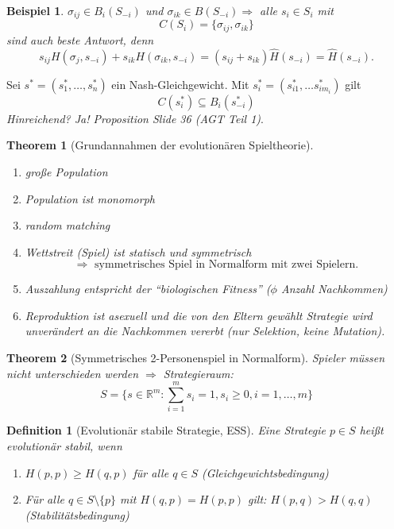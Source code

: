 \documentclass[12pt]{extreport} %
\newcommand{\R}{\mathbb{R}}
\theoremstyle{named}
\newtheorem{unnamedtheorem}{Theorem} \counterwithin{unnamedtheorem}{chapter}
\theoremstyle{itshape}
\newtheorem*{definition}{Definition}
\theoremstyle{normal}
\newtheorem*{beispiel*}{Beispiel}
\begin{document}
  
\begin{beispiel*}
	$\sigma_{ij} \in B_{i}(S_{-i})$ und $\sigma_{ik} \in B(S_{-i}) \Rightarrow$ alle $s_{i} \in S_{i}$ mit
	$$ C(S_{i}) = \{ \sigma_{ij}, \sigma_{ik} \} $$	
	sind auch beste Antwort, denn
	$$ s_{ij} H(\sigma_{j}, s_{-i}) + s_{ik} H(\sigma_{ik}, s_{-i}) = (s_{ij} + s_{ik}) \hat{H}(s_{-i}) = \hat{H}(s_{-i}). $$
\end{beispiel*}

Sei $s^{*} = \left( s_{1}^{*}, \dotsc, s_{n}^{*} \right)$ ein Nash-Gleichgewicht. Mit $s_{i}^{*} = (s_{i1}^{*}, \dotsc s_{im_{i}}^{*})$ gilt
$$ C(s_{i}^{*}) \subseteq B_{i}(s_{-i}^{*}) $$
 \textit{Hinreichend? Ja! Proposition Slide 36 (AGT Teil 1)}.


\begin{unnamedtheorem}[Grundannahmen der evolutionären Spieltheorie]
	\begin{enumerate}
		\item große Population
		\item Population ist monomorph
		\item random matching
		\item Wettstreit (Spiel) ist statisch und symmetrisch
			$$ \Rightarrow \text{ symmetrisches Spiel in Normalform mit zwei Spielern}. $$
		\item Auszahlung entspricht der \enquote{biologischen Fitness} ($\phi$ Anzahl Nachkommen)
		\item Reproduktion ist asexuell und die von den Eltern gewählt Strategie wird unverändert an die Nachkommen vererbt (nur Selektion, keine Mutation).
	\end{enumerate}
\end{unnamedtheorem} 
 

\begin{unnamedtheorem}[Symmetrisches 2-Personenspiel in Normalform]
	Spieler müssen nicht unterschieden werden $\Rightarrow$ Strategieraum:
	$$ S = \{ s\in \R^{m} : \sum_{i=1}^{m} s_{i} = 1, s_{i} \geq 0, i = 1, \dotsc, m \} $$
\end{unnamedtheorem}
  
 
\begin{definition}[Evolutionär stabile Strategie, ESS]
	Eine Strategie $p \in S$ hei{\ss}t evolutionär stabil, wenn
	\begin{enumerate}
		\item $H(p,p) \geq H(q, p)$ für alle $q \in S$ (Gleichgewichtsbedingung)
		\item Für alle $q \in S \setminus \{ p \}$ mit $H(q, p) = H(p, p)$ gilt: $H(p, q) > H(q, q)$ (Stabilitätsbedingung)
	\end{enumerate}
\end{definition}  
\end{document}

